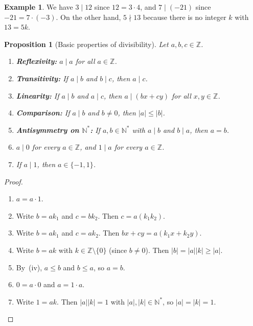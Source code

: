 \documentclass[12pt,a4paper,openany]{book}
\theoremstyle{definition}
\newtheorem{example}[definition]{Example}
\theoremstyle{plain}
\newtheorem{proposition}[definition]{Proposition}
\theoremstyle{remark}
\newcommand{\N}{\mathbb{N}}
\newcommand{\Z}{\mathbb{Z}}
\newcommand{\abs}[1]{\left|#1\right|}
\begin{document}
\begin{example}
\label{ex:div-basic}
We have $3 \mid 12$ since $12 = 3 \cdot 4$, and $7 \mid (-21)$ since
$-21 = 7 \cdot (-3)$. On the other hand, $5 \nmid 13$ because there is no
integer $k$ with $13 = 5k$.
\end{example}

\begin{proposition}[Basic properties of divisibility]
\label{prop:div-properties}
Let $a,b,c \in \Z$.
\begin{enumerate}[label=(\roman*)]
  \item \textbf{Reflexivity:} $a \mid a$ for all $a \in \Z$.
  \item \textbf{Transitivity:} If $a \mid b$ and $b \mid c$, then $a \mid c$.
  \item \textbf{Linearity:} If $a \mid b$ and $a \mid c$, then
        $a \mid (bx + cy)$ for all $x,y \in \Z$.
  \item \textbf{Comparison:} If $a \mid b$ and $b \neq 0$, then $\abs{a} \le \abs{b}$.
  \item \textbf{Antisymmetry on $\N^{*}$:} If $a,b \in \N^{*}$ with $a \mid b$
        and $b \mid a$, then $a = b$.
  \item $a \mid 0$ for every $a \in \Z$, and $1 \mid a$ for every $a \in \Z$.
  \item If $a \mid 1$, then $a \in \{-1, 1\}$.
\end{enumerate}
\end{proposition}

\begin{proof}
\begin{enumerate}[label=(\roman*)]
  \item $a = a \cdot 1$.
  \item Write $b = ak_1$ and $c = bk_2$. Then $c = a(k_1 k_2)$.
  \item Write $b = ak_1$ and $c = ak_2$. Then
        $bx + cy = a(k_1 x + k_2 y)$.
  \item Write $b = ak$ with $k \in \Z \setminus \{0\}$
        (since $b \ne 0$). Then $\abs{b} = \abs{a}\abs{k} \ge \abs{a}$.
  \item By~(iv), $a \le b$ and $b \le a$, so $a = b$.
  \item $0 = a \cdot 0$ and $a = 1 \cdot a$.
  \item Write $1 = ak$. Then $\abs{a}\abs{k} = 1$ with $\abs{a},\abs{k} \in \N^{*}$,
        so $\abs{a} = \abs{k} = 1$. \qedhere
\end{enumerate}
\end{proof}
\end{document}

